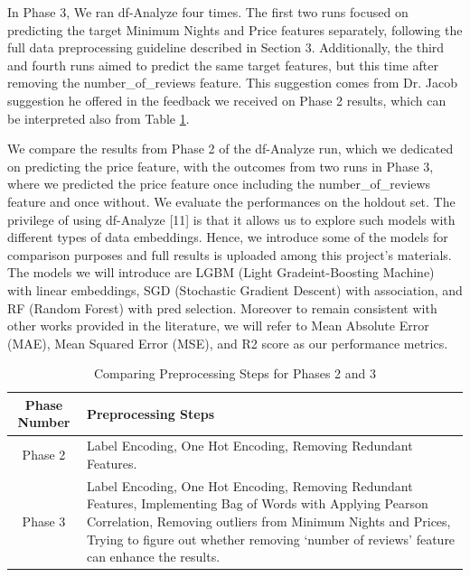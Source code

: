 \documentclass[a4paper,12pt]{article}
\begin{document}
In Phase 3, We ran df-Analyze four times. The first two runs focused on predicting the target Minimum Nights and Price features separately, following the full data preprocessing guideline described in Section 3. Additionally, the third and fourth runs aimed to predict the same target features, but this time after removing the number\_of\_reviews feature. This suggestion comes from Dr. Jacob suggestion he offered in the feedback we received on Phase 2 results, which can be interpreted also from Table \ref{table_preprocessing_phases}.

We compare the results from Phase 2 of the df-Analyze run, which we dedicated on predicting the price feature, with the outcomes from two runs in Phase 3, where we predicted the price feature once including the number\_of\_reviews feature and once without. We evaluate the performances on the holdout set. The privilege of using df-Analyze [11] is that it allows us to explore such models with different types of data embeddings. Hence, we introduce some of the models for comparison purposes and full results is uploaded among this project's materials. The models we will introduce are LGBM (Light Gradeint-Boosting Machine) with linear embeddings, SGD (Stochastic Gradient Descent) with association, and RF (Random Forest) with pred selection. Moreover to remain consistent with other works provided in the literature, we will refer to Mean Absolute Error (MAE), Mean Squared Error (MSE), and R2 score as our performance metrics.

\begin{table}[h!]
\centering
\begin{tabular}{|c|p{10cm}|}
\hline
\textbf{Phase Number} & \textbf{Preprocessing Steps} \\ \hline
Phase 2 & Label Encoding, One Hot Encoding, Removing Redundant Features. \\ \hline
Phase 3 & Label Encoding, One Hot Encoding, Removing Redundant Features, Implementing Bag of Words with Applying Pearson Correlation, Removing outliers from Minimum Nights and Prices, Trying to figure out whether removing `number of reviews' feature can enhance the results. \\ \hline
\end{tabular}
\caption{Comparing Preprocessing Steps for Phases 2 and 3}
\label{table_preprocessing_phases}
\end{table}
\end{document}
